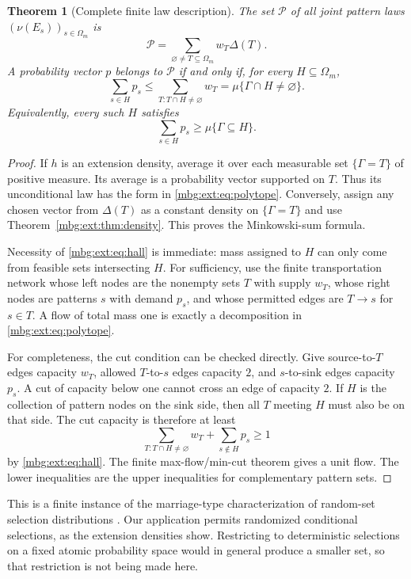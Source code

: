 \documentclass[11pt,letterpaper]{article}
\newtheorem{theorem}{Theorem}[section]
\theoremstyle{definition}
\begin{document}
\begin{theorem}[Complete finite law description]
\label{mbg:ext:thm:polytope}
The set $\mathcal P$ of all joint pattern laws $(\nu(E_s))_{s\in\Omega_m}$ is
\begin{equation}
\boxed{\qquad
\mathcal P=\sum_{\varnothing\ne T\subseteq\Omega_m}w_T\Delta(T).
\qquad}
\label{mbg:ext:eq:polytope}
\end{equation}
A probability vector $p$ belongs to $\mathcal P$ if and only if, for every $H\subseteq\Omega_m$,
\begin{equation}
\sum_{s\in H}p_s\le
\sum_{T:T\cap H\ne\varnothing}w_T
=\mu\{\Gamma\cap H\ne\varnothing\}.
\label{mbg:ext:eq:hall}
\end{equation}
Equivalently, every such $H$ satisfies
\[
\sum_{s\in H}p_s\ge\mu\{\Gamma\subseteq H\}.
\]
\end{theorem}
\begin{proof}
If $h$ is an extension density, average it over each measurable set $\{\Gamma=T\}$ of positive measure. Its average is a probability vector supported on $T$. Thus its unconditional law has the form in \eqref{mbg:ext:eq:polytope}. Conversely, assign any chosen vector from $\Delta(T)$ as a constant density on $\{\Gamma=T\}$ and use Theorem~\ref{mbg:ext:thm:density}. This proves the Minkowski-sum formula.

Necessity of \eqref{mbg:ext:eq:hall} is immediate: mass assigned to $H$ can only come from feasible sets intersecting $H$. For sufficiency, use the finite transportation network whose left nodes are the nonempty sets $T$ with supply $w_T$, whose right nodes are patterns $s$ with demand $p_s$, and whose permitted edges are $T\to s$ for $s\in T$. A flow of total mass one is exactly a decomposition in \eqref{mbg:ext:eq:polytope}.

For completeness, the cut condition can be checked directly. Give source-to-$T$ edges capacity $w_T$, allowed $T$-to-$s$ edges capacity $2$, and $s$-to-sink edges capacity $p_s$. A cut of capacity below one cannot cross an edge of capacity $2$. If $H$ is the collection of pattern nodes on the sink side, then all $T$ meeting $H$ must also be on that side. The cut capacity is therefore at least
\[
\sum_{T:T\cap H\ne\varnothing}w_T
+\sum_{s\notin H}p_s\ge1
\]
by \eqref{mbg:ext:eq:hall}. The finite max-flow/min-cut theorem gives a unit flow. The lower inequalities are the upper inequalities for complementary pattern sets.
\end{proof}

This is a finite instance of the marriage-type characterization of random-set selection distributions \cite{ext:Artstein}. Our application permits randomized conditional selections, as the extension densities show. Restricting to deterministic selections on a fixed atomic probability space would in general produce a smaller set, so that restriction is not being made here.
\end{document}
